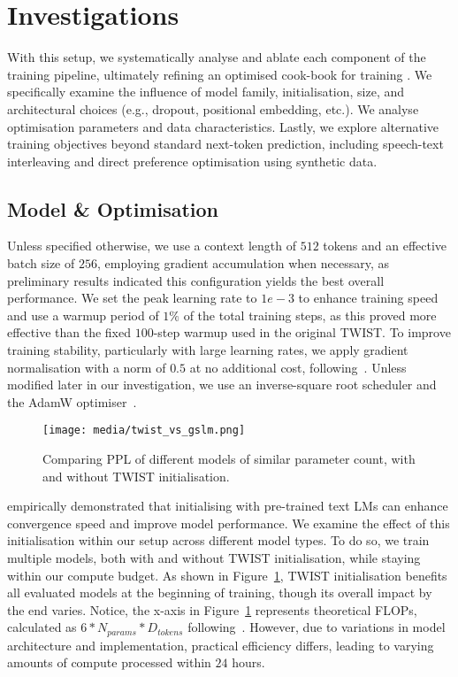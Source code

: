 \section{Investigations}
With this setup, we systematically analyse and ablate each component of the training pipeline, ultimately refining an optimised cook-book for training \slms. We specifically examine the influence of model family, initialisation, size, and architectural choices (e.g., dropout, positional embedding, etc.). We analyse optimisation parameters and data characteristics. Lastly, we explore alternative training objectives beyond standard next-token prediction, including speech-text interleaving and direct preference optimisation using synthetic data. 

\subsection{Model \& Optimisation}
 Unless specified otherwise, we use a context length of $512$ tokens and an effective batch size of $256$, employing gradient accumulation when necessary, as preliminary results indicated this configuration yields the best overall performance. We set the peak learning rate to $1e-3$ to enhance training speed and use a warmup period of $1\%$ of the total training steps, as this proved more effective than the fixed $100$-step warmup used in the original TWIST. To improve training stability, particularly with large learning rates, we apply gradient normalisation with a norm of $0.5$ at no additional cost, following~\citet{geiping2023cramming}. Unless modified later in our investigation, we use an inverse-square root scheduler and the AdamW optimiser~\citep{loshchilov2017decoupled}.

\begin{figure}[t!]
  \texttt{[image: media/twist\_vs\_gslm.png]}
  \caption{Comparing PPL of different models of similar parameter count, with and without TWIST initialisation.}
  \label{fig:initialisation}
\end{figure}

 \citet{twist} empirically demonstrated that initialising \slms with pre-trained text \ac{LM}s can enhance convergence speed and improve model performance. We examine the effect of this initialisation within our setup across different model types. To do so, we train multiple models, both with and without TWIST initialisation, while staying within our compute budget. As shown in Figure~\ref{fig:initialisation}, TWIST initialisation benefits all evaluated models at the beginning of training, though its overall impact by the end varies. Notice, the x-axis in Figure~\ref{fig:initialisation} represents theoretical FLOPs, calculated as $6 * N_{params} * D_{tokens}$ following~\citet{hoffmann2022training}. However, due to variations in model architecture and implementation, practical efficiency differs, leading to varying amounts of compute processed within $24$ hours. 

